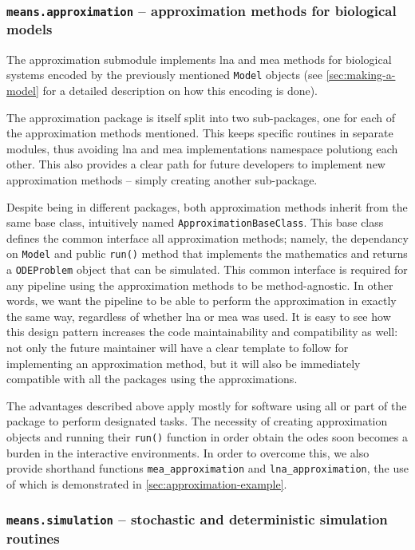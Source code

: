 \subsubsection{{\tt means.approximation} -- approximation methods for biological models}

The approximation submodule implements \gls{lna} and \gls{mea} methods for biological systems encoded by the previously mentioned \verb"Model" objects (see \autoref{sec:making-a-model} for a detailed description on how this encoding is done).

The approximation package is itself split into two sub-packages, one for each of the approximation methods mentioned.
This keeps specific routines in separate modules, thus avoiding \gls{lna} and \gls{mea} implementations namespace polutiong each other.
This also provides a clear path for future developers to implement new approximation methods -- simply creating another sub-package.

Despite being in different packages, both approximation methods inherit from the same base class, intuitively named \verb"ApproximationBaseClass".
This base class defines the common interface all approximation methods; namely, the dependancy on \verb"Model" and public \verb"run()" method that implements the mathematics and returns a \verb"ODEProblem" object that can be simulated.
This common interface is required for any pipeline using the approximation methods to be method-agnostic.
In other words, we want the pipeline to be able to perform the approximation in exactly the same way, regardless of whether \gls{lna} or \gls{mea} was used. 
It is easy to see how this design pattern increases the code maintainability and compatibility as well: not only the future maintainer will have a clear template to follow for implementing an approximation method, but it will also be immediately compatible with all the packages using the approximations.

The advantages described above apply mostly for software using all or part of the \means{} package to perform designated tasks.
The necessity of creating approximation objects and running their \verb"run()" function in order obtain the \gls{ode}s soon becomes a burden in the interactive environments.
In order to overcome this, we also provide shorthand functions \verb"mea_approximation" and \verb"lna_approximation", the use of which is demonstrated in \autoref{sec:approximation-example}.

\subsubsection{{\tt means.simulation} -- stochastic and deterministic simulation routines}


